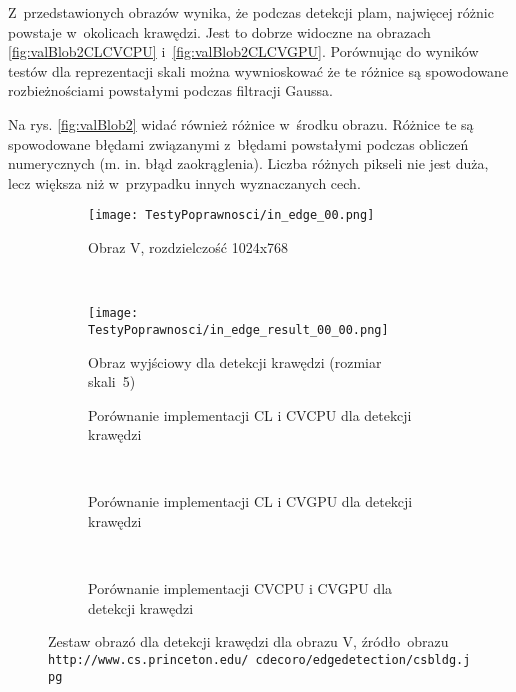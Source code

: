 Z~przedstawionych obrazów wynika, że podczas detekcji plam, najwięcej różnic powstaje w~okolicach krawędzi. Jest to dobrze widoczne na obrazach \ref{fig:valBlob2CLCVCPU} i~\ref{fig:valBlob2CLCVGPU}. Porównując do wyników testów dla reprezentacji skali można wywnioskować że te różnice są spowodowane rozbieżnościami powstałymi podczas filtracji Gaussa.

Na rys. \ref{fig:valBlob2} widać również różnice w~środku obrazu. Różnice te są spowodowane błędami związanymi z~błędami powstałymi podczas obliczeń numerycznych (m. in. błąd zaokrąglenia). Liczba różnych pikseli nie jest duża, lecz większa niż w~przypadku innych wyznaczanych cech.


\begin{figure}[h]

\begin{center}
\begin{subfigure}[t]{0.3\textwidth}
\texttt{[image: TestyPoprawnosci/in\_edge\_00.png]}
\caption{Obraz V, rozdzielczość 1024x768}
\label{fig:valEdge00}
\end{subfigure}
~
\begin{subfigure}[t]{0.3\textwidth}
\texttt{[image: TestyPoprawnosci/in\_edge\_result\_00\_00.png]}
\caption{Obraz wyjściowy dla detekcji krawędzi (rozmiar skali~5)}
\label{fig:valEdgeResult00}
\end{subfigure}
\end{center}

\begin{subfigure}[t]{0.3\textwidth}
	\centering
	\setlength\fboxsep{0pt}
	\setlength\fboxrule{0.5pt}
	\caption{Porównanie implementacji CL i CVCPU dla detekcji krawędzi}
	\label{fig:valEdge0CLCVCPU}
\end{subfigure}
~
\begin{subfigure}[t]{0.3\textwidth}
	\centering
	\setlength\fboxsep{0pt}
	\setlength\fboxrule{0.5pt}
	\caption{Porównanie implementacji CL i CVGPU dla detekcji krawędzi}
	\label{fig:valEdge0CLCVGPU}
\end{subfigure}
~
\begin{subfigure}[t]{0.3\textwidth}
	\centering
	\setlength\fboxsep{0pt}
	\setlength\fboxrule{0.5pt}
	\caption{Porównanie implementacji CVCPU i CVGPU dla detekcji krawędzi}
	\label{fig:valEdge0CVCPUCVGPU}                 
\end{subfigure}
\caption{Zestaw obrazó dla detekcji krawędzi dla obrazu V, \tiny{źródło~obrazu \texttt{http://www.cs.princeton.edu/~cdecoro/edgedetection/csbldg.jpg}}}

\label{fig:valEdge0}
\end{figure}

